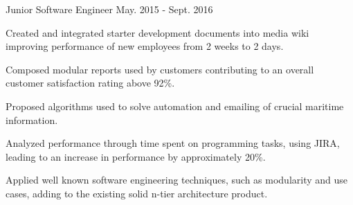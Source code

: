 

\begin{cventries}

  \cventry
    {} %
    {Junior Software Engineer} %
    {} %
    {May. 2015 - Sept. 2016} %
    {
      \begin{cvitems} %
        \item {Created and integrated starter development documents into media wiki improving performance of new employees from 2 weeks to 2 days.}
        \item {Composed modular reports used by customers contributing to an overall customer satisfaction rating above 92\%.}
        \item {Proposed algorithms used to solve automation and emailing of crucial maritime information.}
        \item {Analyzed performance through time spent on programming tasks, using JIRA, leading to an increase in performance by approximately 20\%.}
        \item {Applied well known software engineering techniques, such as modularity and use cases, adding to the existing solid n-tier architecture product.}
      \end{cvitems}
    }
\end{cventries}
